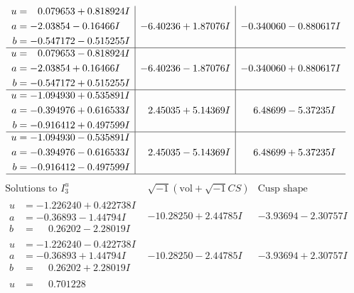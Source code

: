 \documentclass[1p]{elsarticle_modified}
\theoremstyle{definition}
\newcommand{\I}{\sqrt{-1}}
\begin{document}
$$\begin{array}{c|c|c}
\begin{aligned}
u &= \phantom{-}0.079653 + 0.818924 I \\
a &= -2.03854 - 0.16466 I \\
b &= -0.547172 - 0.515255 I\end{aligned}
 & -6.40236 + 1.87076 I & -0.340060 - 0.880617 I \\ \hline\begin{aligned}
u &= \phantom{-}0.079653 - 0.818924 I \\
a &= -2.03854 + 0.16466 I \\
b &= -0.547172 + 0.515255 I\end{aligned}
 & -6.40236 - 1.87076 I & -0.340060 + 0.880617 I \\ \hline\begin{aligned}
u &= -1.094930 + 0.535891 I \\
a &= -0.394976 + 0.616533 I \\
b &= -0.916412 + 0.497599 I\end{aligned}
 & \phantom{-}2.45035 + 5.14369 I & \phantom{-}6.48699 - 5.37235 I \\ \hline\begin{aligned}
u &= -1.094930 - 0.535891 I \\
a &= -0.394976 - 0.616533 I \\
b &= -0.916412 - 0.497599 I\end{aligned}
 & \phantom{-}2.45035 - 5.14369 I & \phantom{-}6.48699 + 5.37235 I\\
 \hline 
 \end{array}$$\newpage$$\begin{array}{c|c|c}  
\text{Solutions to }I^u_{3}& \I (\text{vol} + \sqrt{-1}CS) & \text{Cusp shape}\\
 \hline 
\begin{aligned}
u &= -1.226240 + 0.422738 I \\
a &= -0.36893 - 1.44794 I \\
b &= \phantom{-}0.26202 - 2.28019 I\end{aligned}
 & -10.28250 + 2.44785 I & -3.93694 - 2.30757 I \\ \hline\begin{aligned}
u &= -1.226240 - 0.422738 I \\
a &= -0.36893 + 1.44794 I \\
b &= \phantom{-}0.26202 + 2.28019 I\end{aligned}
 & -10.28250 - 2.44785 I & -3.93694 + 2.30757 I \\ \hline\begin{aligned}
u &= \phantom{-}0.701228\phantom{ +0.000000I} \\

\end{aligned}
\end{array}$$
\end{document}
